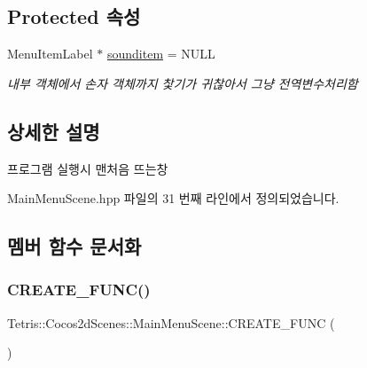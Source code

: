 \subsection*{Protected 속성}
\begin{DoxyCompactItemize}
\item 
Menu\+Item\+Label $\ast$ \hyperlink{class_tetris_1_1_cocos2d_scenes_1_1_main_menu_scene_a39d5adca64f40a97548344531ff019b8}{sounditem} = N\+U\+LL
\begin{DoxyCompactList}\small\item\em 내부 객체에서 손자 객체까지 찿기가 귀찮아서 그냥 전역변수처리함 \end{DoxyCompactList}\end{DoxyCompactItemize}


\subsection{상세한 설명}
프로그램 실행시 맨처음 뜨는창 

Main\+Menu\+Scene.\+hpp 파일의 31 번째 라인에서 정의되었습니다.



\subsection{멤버 함수 문서화}
\mbox{\label{class_tetris_1_1_cocos2d_scenes_1_1_main_menu_scene_a16e190dfef8b0c64f1c5bb03880dd8f7}} 
\subsubsection{\texorpdfstring{C\+R\+E\+A\+T\+E\+\_\+\+F\+U\+N\+C()}{CREATE\_FUNC()}}
{\footnotesize\ttfamily Tetris\+::\+Cocos2d\+Scenes\+::\+Main\+Menu\+Scene\+::\+C\+R\+E\+A\+T\+E\+\_\+\+F\+U\+NC (\begin{DoxyParamCaption}\item[{\hyperlink{class_tetris_1_1_cocos2d_scenes_1_1_main_menu_scene}{Main\+Menu\+Scene}}]{ }\end{DoxyParamCaption})}

